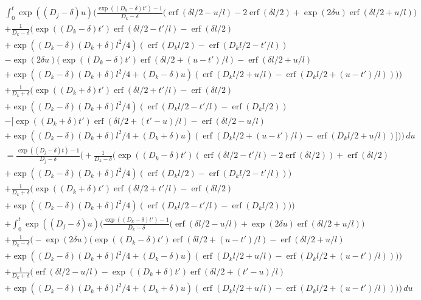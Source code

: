 \documentclass[a4paper]{article}
\newcommand{\erf}{\operatorname{erf}}
\begin{document}
\begin{multline}
  \int_0^t \exp((D_j - \delta) u) \bigg(
  \frac{\exp((D_k-\delta) t') - 1}{D_k-\delta}
  \bigg(
  \erf(\delta l/2 - u/l) - 2\erf(\delta l/2)
  + \exp(2 \delta u) \erf(\delta l/2 + u/l)
  \bigg) \\
  + \frac{1}{D_k-\delta}
  \bigg(
  \exp((D_k-\delta)t') \erf(\delta l/2 - t'/l) - \erf(\delta l/2) \\
  + \exp((D_k-\delta)(D_k+\delta)l^2/4)
  (\erf(D_k l/2) - \erf(D_k l/2  - t'/l) ) \\
  - \exp(2 \delta u)
  (\exp((D_k-\delta)t') \erf(\delta l/2 + (u - t')/l) - \erf(\delta l/2
  + u / l) \\
  + \exp((D_k-\delta)(D_k+\delta)l^2/4 + (D_k - \delta)u)
  (\erf(D_k l/2 + u/l) - \erf(D_k l/2  + (u - t')/l) ))
  \bigg) \\
  + \frac{1}{D_k+\delta}
  \bigg(
  \exp((D_k+\delta)t') \erf(\delta l/2 + t'/l) - \erf(\delta l/2) \\
  + \exp((D_k-\delta)(D_k+\delta)l^2/4)
  (\erf(D_k l/2  - t'/l) - \erf(D_k l/2)) \\
  -
  [\exp((D_k+\delta)t') \erf(\delta l/2 + (t' - u)/l) - \erf(\delta l/2
  - u / l) \\
  + \exp((D_k-\delta)(D_k+\delta)l^2/4 + (D_k + \delta)u)
  (\erf(D_k l/2  + (u - t')/l) - \erf(D_k l/2 + u/l))]
  \bigg)  \bigg) \,du \\
  = 
  \frac{\exp((D_j-\delta) t) - 1}{D_j-\delta} \bigg(
  + \frac{1}{D_k-\delta}
  \bigg(
  \exp((D_k-\delta)t') (\erf(\delta l/2 - t'/l) - 2\erf(\delta l/2))
  + \erf(\delta l/2) \\
  + \exp((D_k-\delta)(D_k+\delta)l^2/4)
  (\erf(D_k l/2) - \erf(D_k l/2  - t'/l) )
  \bigg) \\
  + \frac{1}{D_k+\delta}
  \bigg(
  \exp((D_k+\delta)t') \erf(\delta l/2 + t'/l) - \erf(\delta l/2) \\
  + \exp((D_k-\delta)(D_k+\delta)l^2/4)
  (\erf(D_k l/2  - t'/l) - \erf(D_k l/2))
  \bigg)  
  \bigg) \\
  + 
  \int_0^t \exp((D_j - \delta) u) \bigg(
  \frac{\exp((D_k-\delta) t') - 1}{D_k-\delta}
  \bigg(
  \erf(\delta l/2 - u/l) + \exp(2 \delta u) \erf(\delta l/2 + u/l)
  \bigg) \\
  + \frac{1}{D_k-\delta}
  \bigg(
  - \exp(2 \delta u)
  (\exp((D_k-\delta)t') \erf(\delta l/2 + (u - t')/l) - \erf(\delta l/2
  + u / l) \\
  + \exp((D_k-\delta)(D_k+\delta)l^2/4 + (D_k - \delta)u)
  (\erf(D_k l/2 + u/l) - \erf(D_k l/2  + (u - t')/l) ))
  \bigg) \\
  + \frac{1}{D_k+\delta}
  \bigg(
  \erf(\delta l/2 - u / l)
  - \exp((D_k+\delta)t') \erf(\delta l/2 + (t' - u)/l) \\
  + \exp((D_k-\delta)(D_k+\delta)l^2/4 + (D_k + \delta)u)
  (\erf(D_k l/2 + u/l) - \erf(D_k l/2  + (u - t')/l) )
  \bigg)  \bigg) \,du
\end{multline}
\end{document}
